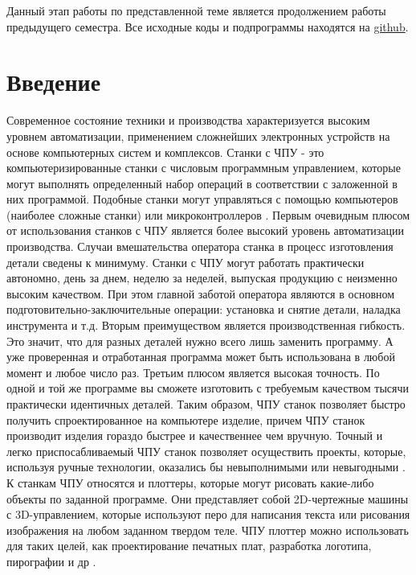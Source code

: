 \documentclass[a4paper,12pt]{article}
\theoremstyle{plain}                          %
\theoremstyle{definition}                     %
\theoremstyle{remark}                         %
\begin{document}
Данный этап работы по представленной теме является продолжением работы предыдущего семестра.
Все исходные коды и подпрограммы находятся на \href{https://github.com/AlexEsn/Project_CNC}{github}.

\section{Введение}

Современное состояние техники и производства характеризуется высоким уровнем автоматизации, применением сложнейших электронных устройств на основе компьютерных систем и комплексов.
Станки с ЧПУ - это компьютеризированные станки с числовым программным управлением, которые могут выполнять определенный набор операций в соответствии с заложенной в них программой.
Подобные станки могут управляться с помощью компьютеров (наиболее сложные станки) или микроконтроллеров
\cite{CNC_Plotter}.
Первым очевидным плюсом от использования станков с ЧПУ является более высокий уровень автоматизации производства. Случаи вмешательства оператора станка в процесс изготовления детали сведены к минимуму. Станки с ЧПУ могут работать практически автономно, день за днем, неделю за неделей, выпуская продукцию с неизменно высоким качеством. При этом главной заботой оператора являются в основном подготовительно-заключительные операции: установка и снятие детали, наладка инструмента и т.д.
Вторым преимуществом является производственная гибкость. Это значит, что для разных деталей нужно всего лишь заменить программу. А уже проверенная и отработанная программа может быть использована в любой момент и любое число раз.
Третьим плюсом является высокая точность. По одной и той же программе вы сможете изготовить с требуемым качеством тысячи практически идентичных деталей.
Таким образом, ЧПУ станок позволяет быстро получить спроектированное на компьютере изделие, причем ЧПУ станок производит изделия гораздо быстрее и качественнее чем вручную. Точный и легко приспосабливаемый ЧПУ станок позволяет осуществить проекты, которые, используя ручные технологии, оказались бы невыполнимыми или невыгодными \cite{sosonkin}.
К станкам ЧПУ относятся и плоттеры, которые могут рисовать какие-либо объекты по заданной программе.
Они представляет собой 2D-чертежные машины с 3D-управлением, которые используют перо для написания текста или рисования изображения на любом заданном твердом теле. ЧПУ плоттер можно использовать для таких целей, как проектирование печатных плат,
разработка логотипа, пирографии и др \cite{girhe_arduino_2018}.
\end{document}
